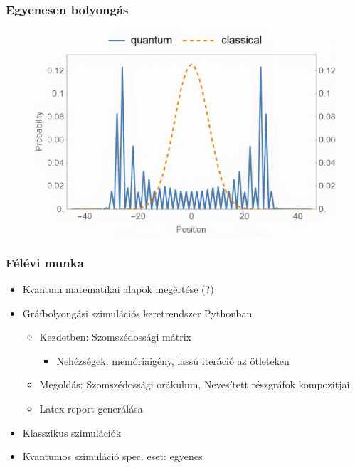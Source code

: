 \documentclass[aspectratio=169]{beamer}
\begin{document}
\begin{frame}
  \frametitle{Egyenesen bolyongás}
  \begin{figure}[H]
    \centering
    \includegraphics[width=0.6\linewidth]{./figures/teve.png}
  \end{figure}
\end{frame}

\begin{frame}
  \frametitle{Félévi munka}
  \begin{itemize}
    \item Kvantum matematikai alapok megértése (?)
    \item Gráfbolyongási szimulációs keretrendszer Pythonban
          \begin{itemize}
            \item Kezdetben: Szomszédossági mátrix
                  \begin{itemize}
                    \item Nehézségek: memóriaigény, lassú iteráció az ötleteken
                  \end{itemize}
            \item Megoldás: Szomszédossági orákulum, Nevesített részgráfok kompozitjai
            \item Latex report generálása
          \end{itemize}
    \item Klasszikus szimulációk
    \item Kvantumos szimuláció spec. eset: egyenes
  \end{itemize}
\end{frame}
\end{document}
